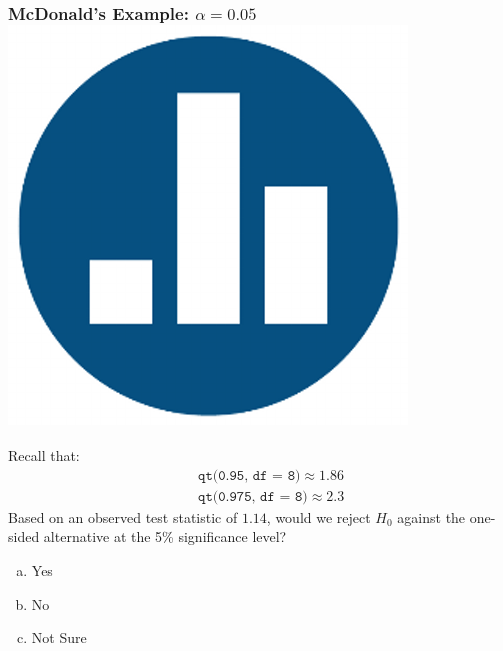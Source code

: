\begin{frame}[t]
\frametitle{McDonald's Example: $\alpha = 0.05$\hfill \includegraphics[scale = 0.05]{./images/clicker}}
Recall that:
\begin{eqnarray*}
		&&\texttt{qt(0.95, df  = 8)}\approx 1.86\\
		 &&\texttt{qt(0.975, df  = 8)}\approx 2.3
	\end{eqnarray*}
Based on an observed test statistic of $1.14$, would we reject $H_0$ against the one-sided alternative at the 5\% significance level?
\begin{enumerate}[(a)]
	\item Yes
	\item No
	\item Not Sure
\end{enumerate}

\end{frame}

